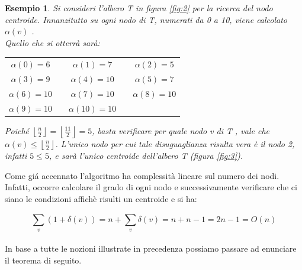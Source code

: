\mbox{}\\\\
\newtheorem{esempio}[definizione]{Esempio}
\begin{esempio}
	\label{es1}
Si consideri l'albero T in figura \ref{fig:2} per la ricerca del nodo centroide.
Innanzitutto su ogni nodo di T, numerati da 0 a 10,  viene calcolato $\alpha(v)$ . \\
Quello che si otterr\`a sar\`a:



\begin{center}
	\begin{tabular}{ c c c c c  }
		$\alpha(0) = 6$ & & $\alpha(1) = 7$ & & $\alpha(2) = 5$ \\ 
		$\alpha(3) = 9$ && $\alpha(4) = 10$ &&  $\alpha(5) =  7$ \\  
		$\alpha(6) = 10$ && $\alpha(7) = 10$ && $\alpha(8) = 10$ \\
		$\alpha(9) = 10$ && $\alpha(10) = 10$ &&
	\end{tabular}
\end{center}

Poich\'e $ \left\lfloor\frac{n}{2} \right\rfloor = \left\lfloor \frac{11}{2} \right\rfloor = 5$, basta verificare per quale nodo v di T , vale che $\alpha(v) \le \left\lfloor\frac{n}{2} \right\rfloor$.
L'unico nodo per cui tale disuguaglianza risulta vera \`e il nodo 2, infatti $5\le 5$, e sar\`a l'unico centroide dell'albero T (figura \ref{fig:3}). 
\end{esempio}

Come gi\'a accennato l'algoritmo ha complessit\`a lineare sul numero dei nodi.
Infatti, occorre calcolare il grado di ogni nodo e successivamente verificare che ci siano le condizioni affich\`e risulti un centroide e si ha:

\begin{equation*}
\sum_{v}^{}(1 + \delta(v)) = n + \sum_{v}^{} \delta(v) = n+n-1= 2n-1 =O(n)
\end{equation*}\\
In base a tutte le nozioni illustrate in precedenza possiamo passare ad enunciare il  teorema di seguito.

